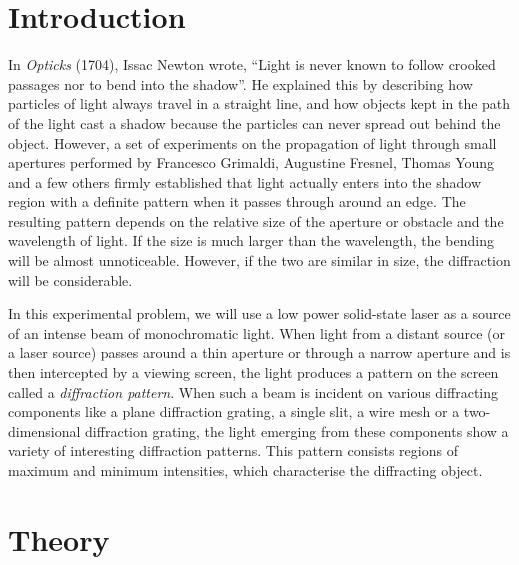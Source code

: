 \section*{Introduction}
	 
In \textit{Opticks} (1704), Issac Newton wrote, ``Light is never known to follow crooked passages nor to bend into the shadow''. He explained this by describing how particles of light always travel in a straight line, and how objects kept in the path of the light cast a shadow because the particles can never spread out behind the object. However, a set of experiments on the propagation of light through small apertures performed by Francesco Grimaldi, Augustine Fresnel, Thomas Young and a few others firmly established that light actually enters into the shadow region with a definite pattern when it passes through around an edge. The resulting pattern depends on the relative size of the aperture or obstacle and the wavelength of light. If the size is much larger than the wavelength, the bending will be almost unnoticeable. However, if the two are similar in size, the diffraction will be considerable.    
     
In this experimental problem, we will use a low power solid-state laser as a source of an intense beam of monochromatic light. When light from a distant source (or a laser source) passes around a thin aperture or through a narrow aperture and is then intercepted by a viewing screen, the light produces a pattern on the screen called a \textit{diffraction pattern}. When such a beam is incident on various diffracting components like a plane diffraction grating, a single slit, a wire mesh or a two-dimensional diffraction grating, the light emerging from these components show a variety of interesting diffraction patterns. This pattern consists regions of maximum and minimum intensities, which characterise the diffracting object. 

\section*{Theory}


